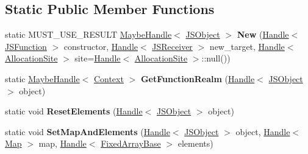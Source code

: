 \subsection*{Static Public Member Functions}
\begin{DoxyCompactItemize}
\item 
static M\+U\+S\+T\+\_\+\+U\+S\+E\+\_\+\+R\+E\+S\+U\+LT \hyperlink{classv8_1_1internal_1_1_maybe_handle}{Maybe\+Handle}$<$ \hyperlink{classv8_1_1internal_1_1_j_s_object}{J\+S\+Object} $>$ {\bfseries New} (\hyperlink{classv8_1_1internal_1_1_handle}{Handle}$<$ \hyperlink{classv8_1_1internal_1_1_j_s_function}{J\+S\+Function} $>$ constructor, \hyperlink{classv8_1_1internal_1_1_handle}{Handle}$<$ \hyperlink{classv8_1_1internal_1_1_j_s_receiver}{J\+S\+Receiver} $>$ new\+\_\+target, \hyperlink{classv8_1_1internal_1_1_handle}{Handle}$<$ \hyperlink{classv8_1_1internal_1_1_allocation_site}{Allocation\+Site} $>$ site=\hyperlink{classv8_1_1internal_1_1_handle}{Handle}$<$ \hyperlink{classv8_1_1internal_1_1_allocation_site}{Allocation\+Site} $>$\+::null())\hypertarget{classv8_1_1internal_1_1_j_s_object_a6fb402f3fea61cd8175c62c31b8a88c7}{}\label{classv8_1_1internal_1_1_j_s_object_a6fb402f3fea61cd8175c62c31b8a88c7}

\item 
static \hyperlink{classv8_1_1internal_1_1_maybe_handle}{Maybe\+Handle}$<$ \hyperlink{classv8_1_1internal_1_1_context}{Context} $>$ {\bfseries Get\+Function\+Realm} (\hyperlink{classv8_1_1internal_1_1_handle}{Handle}$<$ \hyperlink{classv8_1_1internal_1_1_j_s_object}{J\+S\+Object} $>$ object)\hypertarget{classv8_1_1internal_1_1_j_s_object_a9068f77d5af0e07900cdf7fee2810880}{}\label{classv8_1_1internal_1_1_j_s_object_a9068f77d5af0e07900cdf7fee2810880}

\item 
static void {\bfseries Reset\+Elements} (\hyperlink{classv8_1_1internal_1_1_handle}{Handle}$<$ \hyperlink{classv8_1_1internal_1_1_j_s_object}{J\+S\+Object} $>$ object)\hypertarget{classv8_1_1internal_1_1_j_s_object_a06941b36a42de8e56141f247cd8e179e}{}\label{classv8_1_1internal_1_1_j_s_object_a06941b36a42de8e56141f247cd8e179e}

\item 
static void {\bfseries Set\+Map\+And\+Elements} (\hyperlink{classv8_1_1internal_1_1_handle}{Handle}$<$ \hyperlink{classv8_1_1internal_1_1_j_s_object}{J\+S\+Object} $>$ object, \hyperlink{classv8_1_1internal_1_1_handle}{Handle}$<$ \hyperlink{classv8_1_1internal_1_1_map}{Map} $>$ map, \hyperlink{classv8_1_1internal_1_1_handle}{Handle}$<$ \hyperlink{classv8_1_1internal_1_1_fixed_array_base}{Fixed\+Array\+Base} $>$ elements)\hypertarget{classv8_1_1internal_1_1_j_s_object_a05e4934b13dffffd69ce05afe5970e22}{}\label{classv8_1_1internal_1_1_j_s_object_a05e4934b13dffffd69ce05afe5970e22}


\end{DoxyCompactItemize}
